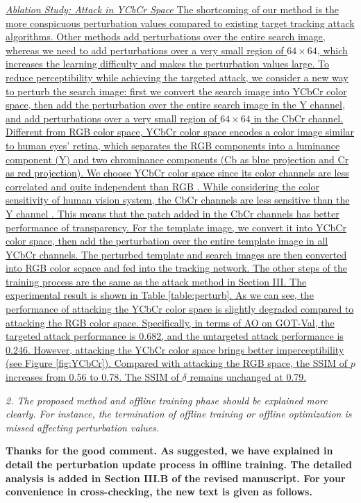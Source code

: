 \documentclass[12pt]{article}
\begin{document}
\uline{\textit{Ablation Study: Attack in YCbCr Space}
The shortcoming of our method is the more conspicuous perturbation values compared to existing target tracking attack algorithms. Other methods add perturbations over the entire search image, whereas we need to add perturbations over a very small region of $64 \times 64$, which increases the learning difficulty and makes the perturbation values large. To reduce perceptibility while achieving the targeted attack, we consider a new way to perturb the search image: first we convert the search image into YCbCr color space, then add the perturbation over the entire search image in the Y channel, and add perturbations over a very small region of $64 \times 64$ in the CbCr channel. Different from RGB color space, YCbCr color space encodes a color image similar to human eyes’ retina, which separates the RGB components into a luminance component (Y) and two chrominance components (Cb as blue projection and Cr as red projection). We choose YCbCr color space since its color channels are less correlated and quite independent than RGB \cite{8630918}. While considering the color sensitivity of human vision system, the CbCr channels are less sensitive than the Y channel \cite{8630918}. This means that the patch added in the CbCr channels has better performance of transparency.
For the template image, we convert it into YCbCr color space, then add the perturbation over the entire template image in all YCbCr channels. The perturbed template and search images are then converted into RGB color scpace and fed into the tracking network. The other steps of the training process are the same as the attack method in Section III. The experimental result is shown in Table \ref{table:perturb}. As we can see, the performance of attacking the YCbCr color space is slightly degraded compared to attacking the RGB color space. Specifically, in terms of AO on GOT-Val, the targeted attack performance is 0.682, and the untargeted attack performance is 0.246. However, attacking the YCbCr color space brings better imperceptibility (see Figure \ref{fig:YCbCr}). Compared with attacking the RGB space, the SSIM of $p$ increases from 0.56 to 0.78. The SSIM of $\delta$ remains unchanged at 0.79.
}

\textit{2. The proposed method and offline training phase should be explained more clearly. For instance, the termination of offline training or offline optimization is missed affecting perturbation values.}

\textbf{Thanks for the good comment. As suggested, we have explained in detail the perturbation update process in offline training.
The detailed analysis is added in Section III.B of the revised manuscript.
For your convenience in cross-checking, the new text is given as follows.}
\end{document}
